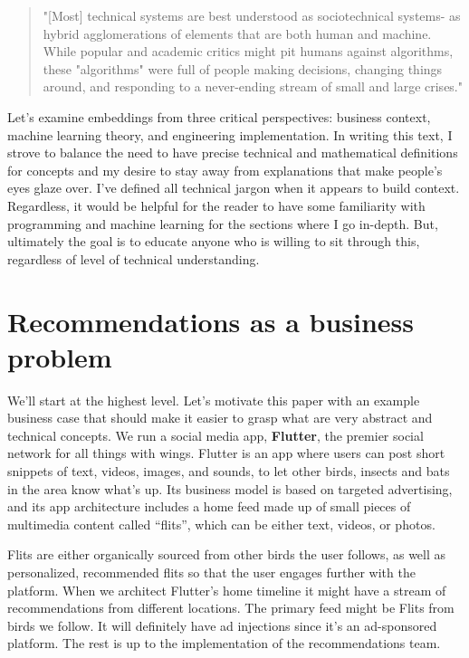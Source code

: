 \documentclass[draft, 11pt]{diazessay} %
\begin{document}
\begin{quote}
"[Most] technical systems are best understood as sociotechnical systems- as hybrid agglomerations of elements that are both human and machine. While popular and academic critics might pit humans against algorithms, these "algorithms" were full of people making decisions, changing things around, and responding to a never-ending stream of small and large crises."
\end{quote}

Let's examine embeddings from three critical perspectives: business context, machine learning theory, and engineering implementation. In writing this text, I strove to balance the need to have precise technical and mathematical definitions for concepts and my desire to stay away from explanations that make people's eyes glaze over. I've defined all technical jargon when it appears to build context. Regardless, it would be helpful for the reader to have some familiarity with programming and machine learning for the sections where I go in-depth. But, ultimately the goal is to educate anyone who is willing to sit through this, regardless of level of technical understanding. 


\section{Recommendations as a business problem}

We'll start at the highest level. Let's motivate this paper with an example business case that should make it easier to grasp what are very abstract and technical concepts. We run a social media app, \textbf{Flutter}, the premier social network for all things with wings. Flutter is an app where users can post short snippets of text, videos, images, and sounds, to let other birds, insects and bats in the area know what’s up. Its business model is based on targeted advertising, and its app architecture includes a home feed made up of small pieces of multimedia content called “flits”, which can be either text, videos, or photos. 

Flits are either organically sourced from other birds the user follows, as well as personalized, recommended flits so that the user engages further with the platform. When we architect Flutter’s home timeline  it might have a stream of recommendations from different locations. The primary feed might be Flits from birds we follow. It will definitely have ad injections since it's an ad-sponsored platform. The rest is up to the implementation of the recommendations team.
\end{document}
